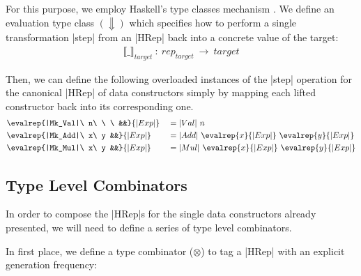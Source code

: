 For this purpose, we employ Haskell's type classes mechanism \tocite{}.
%
We define an evaluation type class $(\Downarrow)$ which specifies how to perform
a single transformation |step| from an |HRep| back into a concrete value of the
target:
%
\begin{align*}
  \llbracket \_ \rrbracket_{target}\ :\ rep_{target}\ \rightarrow\ target
\end{align*}


Then, we can define the following overloaded instances of the |step| operation
for the canonical |HRep| of data constructors simply by mapping each lifted
constructor back into its corresponding one.
%
\begin{alignat*}{4}
  &\evalrep{|Mk_Val|\ n\ \ \ &&}{|Exp|}
    &&= |Val|\ n \\
  &\evalrep{|Mk_Add|\ x\ y   &&}{|Exp|}
    &&= |Add|\ \evalrep{x}{|Exp|}\ \evalrep{y}{|Exp|} \\
  &\evalrep{|Mk_Mul|\ x\ y   &&}{|Exp|}
    &&= |Mul|\ \evalrep{x}{|Exp|}\ \evalrep{y}{|Exp|}
\end{alignat*}






\subsection{\textbf{Type Level Combinators}}

In order to compose the |HRep|s for the single data constructors already
presented, we will need to define a series of type level combinators.

In first place, we define a type combinator ($\otimes$) to tag a |HRep| with an
explicit generation frequency:

